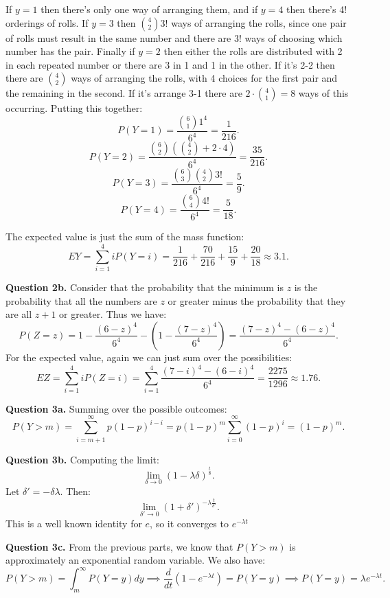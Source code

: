 \documentclass[letterpaper, reqno,11pt]{article}
\begin{document}
If $y=1$ then there's only one way of arranging them, and if $y=4$ then there's 4! orderings of rolls. If $y=3$ then ${4\choose 2}3!$ ways of arranging the rolls, since one pair of rolls must result in the same number and there are $3!$ ways of choosing which number has the pair. Finally if $y=2$ then either the rolls are distributed with 2 in each repeated number or there are 3 in 1 and 1 in the other. If it's 2-2 then there are ${4\choose 2}$ ways of arranging the rolls, with 4 choices for the first pair and the remaining in the second. If it's arrange 3-1 there are $2\cdot {4\choose 1}=8$ ways of this occurring. Putting this together: 
\[
    P(Y=1)=\frac{{6\choose 1}1^{4}}{6^{4}}=\frac{1}{216}
.\]
\[
    P(Y=2)=\frac{{6\choose 2}\left( {4\choose 2}+2\cdot 4 \right) }{6^{4}}=\frac{35}{216}
.\]
\[
    P(Y=3)=\frac{{6\choose 3}{4\choose 2}3! }{6^{4}}=\frac{5}{9}
.\]
\[
    P(Y=4)=\frac{{6\choose 4}4! }{6^{4}}=\frac{5}{18}
.\]

The expected value is just the sum of the mass function: 
\[
EY=\sum_{i=1}^{4}i P(Y=i)=\frac{1}{216}+\frac{70}{216}+\frac{15}{9}+\frac{20}{18}\approx 3.1
.\]

{\medskip\noindent\bf Question 2b.} Consider that the probability that the minimum is $z$ is the probability that all the numbers are $z$ or greater minus the probability that they are all $z+1$ or greater. Thus we have: 
\[
P(Z=z)=1-\frac{(6-z)^{4}}{6^{4}}-\left( 1-\frac{(7-z)^{4}}{6^{4}} \right) =\frac{(7-z)^{4}-(6-z)^{4}}{6^{4}}
.\]
For the expected value, again we can just sum over the possibilities: 
\[
EZ=\sum_{i=1}^{4}i P(Z=i)=\sum_{i=1}^{4}\frac{(7-i)^{4}-(6-i)^{4}}{6^{4}}=\frac{2275}{1296}\approx 1.76
.\]

{\medskip\noindent\bf Question 3a.} Summing over the possible outcomes: 
\[
P(Y>m)=\sum_{i=m+1}^{\infty}p(1-p)^{i-i}=p(1-p)^{m}\sum_{i=0}^{\infty}(1-p)^{i}=(1-p)^{m}
.\]

{\medskip\noindent\bf Question 3b.} Computing the limit: 
\[
\lim_{\delta\to 0}\left( 1-\lambda\delta \right)^{\frac{t}{\delta}}
.\]
Let $\delta'=-\delta\lambda$. Then: 
\[
\lim_{\delta'\to 0}\left( 1+\delta' \right)^{-\lambda\frac{t}{\delta'}}
.\]
This is a well known identity for $e$, so it converges to $e^{-\lambda t}$

{\medskip\noindent\bf Question 3c.} From the previous parts, we know that $P(Y>m)$ is approximately an exponential random variable. We also have: 
\[
P(Y>m)=\int_m^{\infty}P(Y=y)dy\implies \frac{d}{dt}(1-e^{-\lambda t})=P(Y=y)\implies P(Y=y)=\lambda e^{-\lambda t}
.\]
\end{document}
